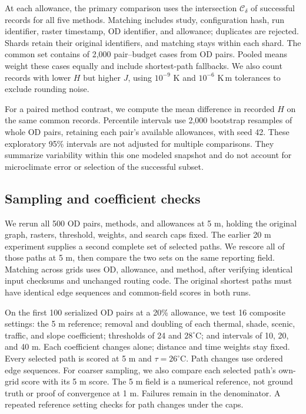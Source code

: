 \documentclass[sigconf,nonacm]{acmart}
\begin{document}
At each allowance, the primary comparison uses the intersection $\mathcal C_\delta$ of successful records for all five methods. Matching includes study, configuration hash, run identifier, raster timestamp, OD identifier, and allowance; duplicates are rejected. Shards retain their original identifiers, and matching stays within each shard. The common set contains \CommonCases{} of 2,000 pair--budget cases from \CommonPairs{} OD pairs. Pooled means weight these cases equally and include shortest-path fallbacks. We also count records with lower $H$ but higher $J$, using $10^{-9}$ K and $10^{-6}$ K\,m tolerances to exclude rounding noise.

For a paired method contrast, we compute the mean difference in recorded $H$ on the same common records. Percentile intervals use 2,000 bootstrap resamples of whole OD pairs, retaining each pair's available allowances, with seed 42. These exploratory 95\% intervals are not adjusted for multiple comparisons. They summarize variability within this one modeled snapshot and do not account for microclimate error or selection of the successful subset.

\subsection{Sampling and coefficient checks}\label{sec:sensitivity}
We rerun all 500 OD pairs, methods, and allowances at 5 m, holding the original graph, rasters, threshold, weights, and search caps fixed. The earlier 20 m experiment supplies a second complete set of selected paths. We rescore all \FullReferenceRescored{} of those paths at 5 m, then compare the two sets on the same reporting field. Matching across grids uses OD, allowance, and method, after verifying identical input checksums and unchanged routing code. The original shortest paths must have identical edge sequences and common-field scores in both runs.

On the first 100 serialized OD pairs at a 20\% allowance, we test 16 composite settings: the 5 m reference; removal and doubling of each thermal, shade, scenic, traffic, and slope coefficient; thresholds of 24 and $28^\circ$C; and intervals of 10, 20, and 40 m. Each coefficient changes alone; distance and time weights stay fixed. Every selected path is scored at 5 m and $\tau=26^\circ$C. Path changes use ordered edge sequences. For coarser sampling, we also compare each selected path's own-grid score with its 5 m score. The 5 m field is a numerical reference, not ground truth or proof of convergence at 1 m. Failures remain in the denominator. A repeated reference setting checks for path changes under the caps.
\end{document}
